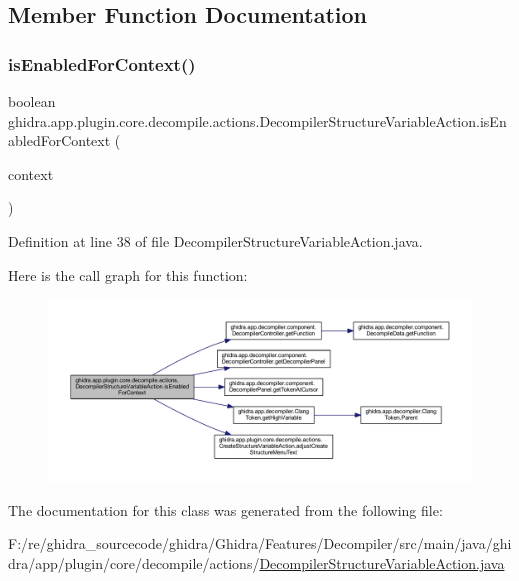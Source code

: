 \subsection{Member Function Documentation}
\mbox{\label{classghidra_1_1app_1_1plugin_1_1core_1_1decompile_1_1actions_1_1_decompiler_structure_variable_action_ac689e3baa3a6b9ea82c2280eecf184ed}} 
\subsubsection{\texorpdfstring{isEnabledForContext()}{isEnabledForContext()}}
{\footnotesize\ttfamily boolean ghidra.\+app.\+plugin.\+core.\+decompile.\+actions.\+Decompiler\+Structure\+Variable\+Action.\+is\+Enabled\+For\+Context (\begin{DoxyParamCaption}\item[{Action\+Context}]{context }\end{DoxyParamCaption})\hspace{0.3cm}{\ttfamily [inline]}}



Definition at line 38 of file Decompiler\+Structure\+Variable\+Action.\+java.

Here is the call graph for this function\+:
\nopagebreak
\begin{figure}[H]
\begin{center}
\leavevmode
\includegraphics[width=350pt]{classghidra_1_1app_1_1plugin_1_1core_1_1decompile_1_1actions_1_1_decompiler_structure_variable_action_ac689e3baa3a6b9ea82c2280eecf184ed_cgraph}
\end{center}
\end{figure}


The documentation for this class was generated from the following file\+:\begin{DoxyCompactItemize}
\item 
F\+:/re/ghidra\+\_\+sourcecode/ghidra/\+Ghidra/\+Features/\+Decompiler/src/main/java/ghidra/app/plugin/core/decompile/actions/\mbox{\hyperlink{_decompiler_structure_variable_action_8java}{Decompiler\+Structure\+Variable\+Action.\+java}}\end{DoxyCompactItemize}
